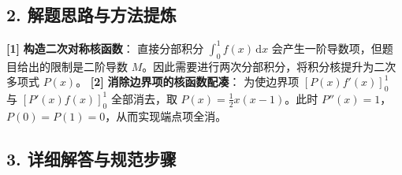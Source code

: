 \documentclass[11pt,a4paper,UTF8]{ctexart}
\begin{document}
\subsection{2. 解题思路与方法提炼}
\begin{solbox}[分步推导与答题规范]
\textbf{[1]}  \textbf{构造二次对称核函数}：
直接分部积分 $\int_0^1 f(x)\,\mathrm{d}x$ 会产生一阶导数项，但题目给出的限制是二阶导数 $M$。因此需要进行两次分部积分，将积分核提升为二次多项式 $P(x)$。
\textbf{[2]}  \textbf{消除边界项的核函数配凑}：
为使边界项 $[P(x)f'(x)]_0^1$ 与 $[P'(x)f(x)]_0^1$ 全部消去，取 $P(x) = \frac{1}{2}x(x-1)$。此时 $P''(x) = 1$，$P(0)=P(1)=0$，从而实现端点项全消。
\end{solbox}


\subsection{3. 详细解答与规范步骤}
\end{document}
